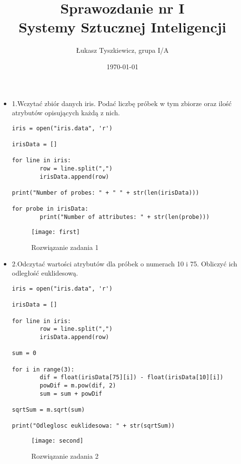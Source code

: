 \documentclass[12pt,a4paper]{article}
\begin{document}
	
	\title{Sprawozdanie nr I\\Systemy Sztucznej Inteligencji}
	\author{Łukasz Tyszkiewicz, grupa I/A}
	\date{\today}
	
	\maketitle
	\begin{itemize}
		\item 1.Wczytać zbiór danych iris. Podać liczbę próbek w tym zbiorze oraz ilość atrybutów opisujących każdą z nich.
	\begin{lstlisting}
iris = open("iris.data", 'r')

irisData = []

for line in iris:
        row = line.split(",")
        irisData.append(row)

print("Number of probes: " + " " + str(len(irisData)))

for probe in irisData:
        print("Number of attributes: " + str(len(probe)))

	\end{lstlisting}
		\begin{figure}[h]
                        \texttt{[image: first]}
                        \centering
			\caption{Rozwiązanie zadania 1}
			\label{fig:fig1}
                \end{figure}
                \clearpage 

                \item 2.Odczytać wartości atrybutów dla próbek o numerach 10 i 75. Obliczyć ich odległość euklidesową.
	\begin{lstlisting}
iris = open("iris.data", 'r')

irisData = []

for line in iris:
        row = line.split(",")
        irisData.append(row)

sum = 0

for i in range(3):
        dif = float(irisData[75][i]) - float(irisData[10][i])
        powDif = m.pow(dif, 2)
        sum = sum + powDif

sqrtSum = m.sqrt(sum)

print("Odleglosc euklidesowa: " + str(sqrtSum))

	\end{lstlisting}
		\begin{figure}[h]
                        \texttt{[image: second]}
                        \centering
			\caption{Rozwiązanie zadania 2}
			\label{fig:fig2}
                \end{figure}
                \clearpage 


\end{itemize}
\end{document}
